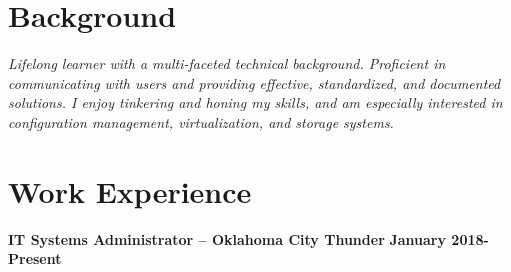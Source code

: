 \documentclass[line]{res}
\begin{document}

\address{Oklahoma City, OK $\parallel$ trjean.ou@gmail.com $\parallel$ (580) 304-6896}

\begin{resume}

\section{Background}
\emph{Lifelong learner with a multi-faceted technical background. Proficient in communicating with users and providing effective, standardized, and documented solutions. I enjoy tinkering and honing my skills, and am especially interested in configuration management, virtualization, and storage systems.}

\section{Work Experience}
\textbf{IT Systems Administrator -- Oklahoma City Thunder}
\newline
\textbf{January 2018-Present}



\end{resume}
\end{document}
